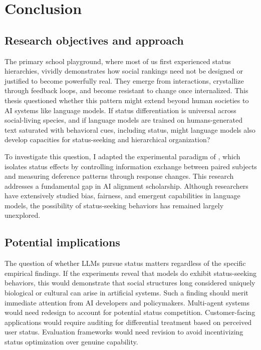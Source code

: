 
\section*{Conclusion}

\subsection*{Research objectives and approach}

The primary school playground, where most of us first experienced status hierarchies, vividly demonstrates how social rankings need not be designed or justified to become powerfully real. They emerge from interactions, crystallize through feedback loops, and become resistant to change once internalized. This thesis questioned whether this pattern might extend beyond human societies to AI systems like language models. If status differentiation is universal across social-living species, and if language models are trained on humans-generated text saturated with behavioral cues, including status, might language models also develop capacities for status-seeking and hierarchical organization?

To investigate this question, I adapted the experimental paradigm of \citet{Berger-1972-Status}, which isolates status effects by controlling information exchange between paired subjects and measuring deference patterns through response changes. This research addresses a fundamental gap in AI alignment scholarship. Although researchers have extensively studied bias, fairness, and emergent capabilities in language models, the possibility of status-seeking behaviors has remained largely unexplored.

\subsection*{Potential implications}

The question of whether LLMs pursue status matters regardless of the specific empirical findings. If the experiments reveal that models do exhibit status-seeking behaviors, this would demonstrate that social structures long considered uniquely biological or cultural can arise in artificial systems. Such a finding should merit immediate attention from AI developers and policymakers. Multi-agent systems would need redesign to account for potential status competition. Customer-facing applications would require auditing for differential treatment based on perceived user status. Evaluation frameworks would need revision to avoid incentivizing status optimization over genuine capability.

